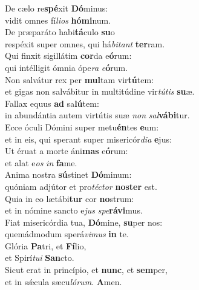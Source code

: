 \oddverse De cælo re\textbf{spé}xit \textbf{Dó}minus:~\*\\
\oddverse vidit omnes fí\textit{li}\textit{os} \textbf{hó}\textbf{mi}num.\\
\evenverse De præparáto habi\textbf{tá}culo \textbf{su}o~\*\\
\evenverse respéxit super omnes, qui há\textit{bi}\textit{tant} \textbf{ter}ram.\\
\oddverse Qui finxit sigillátim \textbf{cor}da e\textbf{ó}rum:~\*\\
\oddverse qui intélligit ómnia ópe\textit{ra} \textit{e}\textbf{ó}rum.\\
\evenverse Non salvátur rex per \textbf{mul}tam vir\textbf{tú}tem:~\*\\
\evenverse et gigas non salvábitur in multitúdine vir\textit{tú}\textit{tis} \textbf{su}æ.\\
\oddverse Fallax equus \textbf{ad} sa\textbf{lú}tem:~\*\\
\oddverse in abundántia autem virtútis suæ \textit{non} \textit{sal}\textbf{vá}\textbf{bi}tur.\\
\evenverse Ecce óculi Dómini super metu\textbf{én}tes \textbf{e}um:~\*\\
\evenverse et in eis, qui sperant super misericór\textit{di}\textit{a} \textbf{e}jus:\\
\oddverse Ut éruat a morte áni\textbf{mas} e\textbf{ó}rum:~\*\\
\oddverse et alat e\textit{os} \textit{in} \textbf{fa}me.\\
\evenverse Anima nostra \textbf{sú}stinet \textbf{Dó}minum:~\*\\
\evenverse quóniam adjútor et pro\textit{té}\textit{ctor} \textbf{no}\textbf{ster} est.\\
\oddverse Quia in eo lætábi\textbf{tur} cor \textbf{no}strum:~\*\\
\oddverse et in nómine sancto e\textit{jus} \textit{spe}\textbf{rá}\textbf{vi}mus.\\
\evenverse Fiat misericórdia tua, \textbf{Dó}mine, \textbf{su}per nos:~\*\\
\evenverse quemádmodum sperá\textit{vi}\textit{mus} \textbf{in} te.\\
\oddverse Glória \textbf{Pa}tri, et \textbf{Fí}lio,~\*\\
\oddverse et Spirí\textit{tu}\textit{i} \textbf{San}cto.\\
\evenverse Sicut erat in princípio, et \textbf{nunc}, et \textbf{sem}per,~\*\\
\evenverse et in sǽcula sæcu\textit{ló}\textit{rum}. \textbf{A}men.\\
